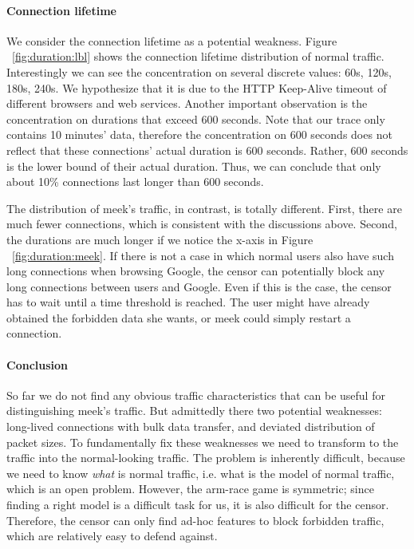 \documentclass[conference]{IEEEtran}
\begin{document}
\paragraph{Connection lifetime}
We consider the connection lifetime as a potential weakness. Figure ~\ref{fig:duration:lbl} shows the 
connection lifetime distribution of normal traffic. Interestingly we can see the concentration on 
several discrete values: 60s, 120s, 180s, 240s. We hypothesize that it is due to the HTTP Keep-Alive 
timeout of different browsers and web services. Another important observation is the concentration on 
durations that exceed 600 seconds. Note that our trace only contains 10 minutes' data, therefore the concentration 
on 600 seconds does not reflect that these connections' actual duration is 600 seconds. Rather, 600 seconds
is the lower bound of their actual duration. Thus, we can conclude that only about 10\% connections last 
longer than 600 seconds.

The distribution of meek's traffic, in contrast, is totally different. First, there are much fewer connections, which is 
consistent with the discussions above. Second, the durations are much longer if we notice the x-axis in Figure ~\ref{fig:duration:meek}. If there is not a case in which normal users also have such long connections when browsing Google, the 
censor can potentially block any long connections between users and Google. Even if this is the case, the
censor has to wait until a time threshold is reached. The user might have already obtained the forbidden data she wants, or 
meek could simply restart a connection.

\paragraph{Conclusion} So far we do not find any obvious traffic characteristics that can be useful for
distinguishing meek's traffic. But admittedly there two potential weaknesses: long-lived connections 
with bulk data transfer, and deviated distribution of packet sizes. To fundamentally fix these weaknesses 
we need to transform to the traffic into the normal-looking traffic. The problem is inherently difficult, because we need to know \emph{what} is normal traffic, i.e. what is the model of normal traffic, which is an open problem. However, 
the arm-race game is symmetric; since finding a right model is a difficult task for us, it is also difficult for 
the censor. Therefore, the censor can only find ad-hoc features to block forbidden traffic, which are relatively 
easy to defend against. 
\end{document}
